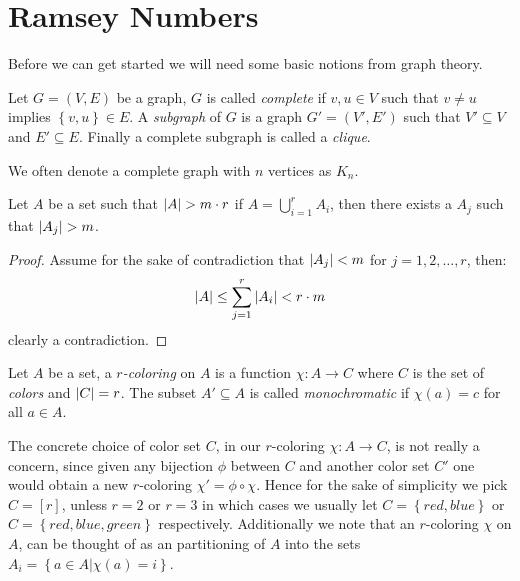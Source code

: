 \chapter{Ramsey Numbers}

Before we can get started we will need some basic notions from graph theory.
\begin{definition}
	Let $G = (V, E)$ be a graph, $G$ is called \textit{complete} if $v, u \in V$ such that $v \neq u$ implies $\left\{v, u\right\} \in E$. A \textit{subgraph} of $G$ is a graph $G' = (V', E')$ such that $V' \subseteq V$ and $E' \subseteq E$. Finally a complete subgraph is called a \textit{clique}.
\end{definition}
We often denote a complete graph with $n$ vertices as $K_n$.


\begin{theorem}\label{thm:gpp}
	Let $A$ be a set such that $\left\lvert A\right\rvert > m \cdot r$ if $A = \bigcup_{i = 1}^{r} A_i$, then there exists a $A_j$ such that $\left\lvert A_j\right\rvert > m$.
\end{theorem}
\begin{proof}
	Assume for the sake of contradiction that $\left\lvert A_j\right\rvert < m$ for $j = 1, 2, \ldots, r$, then:
	\begin{equation*}
		\left\lvert A\right\rvert \leq \sum_{j = 1}^r \left\lvert A_i\right\rvert < r \cdot m
	\end{equation*}
	clearly a contradiction.
\end{proof}

\begin{definition}
	Let $A$ be a set, a \textit{$r$-coloring} on $A$ is a function $\chi: A \to C$ where $C$ is the set of \textit{colors} and $\left\lvert C\right\rvert = r$. The subset $A' \subseteq A$ is called \textit{monochromatic} if $\chi(a) = c$ for all $a \in A$.
\end{definition}
\begin{remark}
	The concrete choice of color set $C$, in our $r$-coloring $\chi: A \to C$, is not really a concern, since given any bijection $\phi$ between $C$ and another color set $C'$ one would obtain a new $r$-coloring $\chi' = \phi \circ \chi$.
	Hence for the sake of simplicity we pick $C = [r]$, unless $r = 2$ or $r = 3$ in which cases we usually let $C = \left\{red, blue\right\}$ or $C = \left\{red, blue, green\right\}$ respectively. Additionally we note that an $r$-coloring $\chi$ on $A$, can be thought of as an partitioning of $A$ into the sets $A_i = \left\{a \in A | \chi(a) = i\right\}$.
\end{remark}

